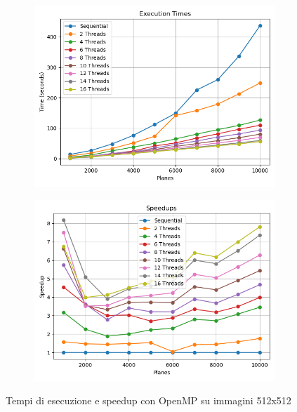 \begin{figure}[H]
    \centering
    \begin{subfigure}{0.49\textwidth}
        \centering
        \includegraphics[width=\textwidth]{../result_16/csv/test10000/plots/512/results_times}
    \end{subfigure}
    \begin{subfigure}{0.49\textwidth}
        \centering
        \includegraphics[width=\textwidth]{../result_16/csv/test10000/plots/512/results_speedup}
    \end{subfigure}
    \caption{Tempi di esecuzione e speedup con OpenMP su immagini 512x512}
    \label{fig:omp_10000_512}
\end{figure}
